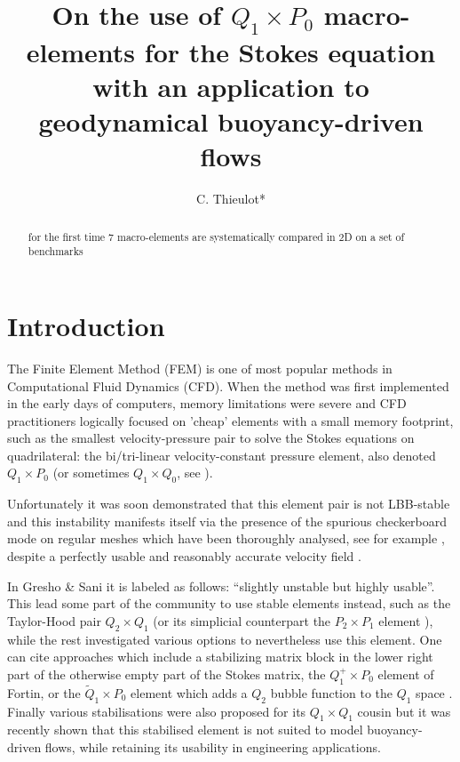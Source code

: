 \documentclass[a4paper,12pt]{article}
\title{
On the use of $Q_1\times P_0$ macro-elements for the Stokes equation with an application to 
geodynamical buoyancy-driven flows
}
\author{C. Thieulot*}
\begin{document}
\maketitle

\begin{abstract}
for the first time 7 macro-elements are systematically compared in 2D on a set of benchmarks
\end{abstract}

\tableofcontents

\section{Introduction} \label{sec1}


The Finite Element Method (FEM) is one of most popular methods in Computational Fluid Dynamics (CFD). 
When the method was first implemented 
in the early days of computers, memory limitations were severe and CFD practitioners logically 
focused on 'cheap' elements with a small memory footprint, such as the smallest velocity-pressure pair to 
solve the Stokes equations on quadrilateral: the bi/tri-linear velocity-constant pressure element, 
also denoted $Q_1 \times P_0$ (or sometimes $Q_1\times Q_0$, see \cite{grsa}). 

Unfortunately it was soon demonstrated that this element pair is not LBB-stable \cite{boni84,boni85} and this instability
manifests itself via the presence of the spurious checkerboard mode on regular meshes
which have been thoroughly analysed, see for example \cite{grsi94,chpc95,sagl81a,sagl81b}, 
despite a perfectly usable and reasonably accurate velocity field \cite{grsa,dohu03,bobf08,bobf13}.


In Gresho \& Sani \cite{grsa} it is labeled as follows: ``slightly unstable but highly usable''.
This lead some part of the community to use stable elements instead, such as the Taylor-Hood pair $Q_2\times Q_1$
(or its simplicial counterpart the $P_2\times P_1$ element \cite{thba25}), 
while the rest investigated various options to nevertheless use this element.
One can cite approaches which include a stabilizing matrix block in the lower right part of 
the otherwise empty part of the Stokes matrix\cite{kesi88,sike90,vibo92,nosi98},
the $Q_1^+\times P_0$ element of Fortin\cite{fort81}, or the $\tilde{Q}_1\times P_0$ element which adds 
a $Q_2$ bubble function to the $Q_1$ space \cite[p265]{brfo}.
Finally various stabilisations were also proposed for its 
$Q_1\times Q_1$ cousin \cite{dobo04,bodg06,busa13} but it was recently shown\cite{thba22} 
that this stabilised element is not suited to model buoyancy-driven flows, 
while retaining its usability in engineering applications.  
\end{document}
